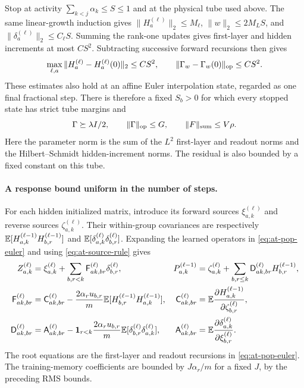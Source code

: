 Stop at activity $\sum_{k<j}\alpha_k\le S\le1$ and at the physical tube
used above.  The same linear-growth induction gives $\|H_a^{(\ell)}\|_2
\le M_\ell$, $\|w\|_2\le2M_LS$, and
$\|\delta_a^{(\ell)}\|_2\le C_\ell S$.
Summing the rank-one updates gives first-layer and hidden increments
at most $CS^2$.  Subtracting successive forward recursions then gives
\[
 \max_{\ell,a}\|H_a^{(\ell)}-H_a^{(\ell)}(0)\|_2\le CS^2,\qquad
 \|\Gamma_w-\Gamma_w(0)\|_{\rm op}\le CS^2.
\]
These estimates also hold at an affine Euler interpolation state, regarded
as one final fractional step.  There is therefore a fixed $S_b>0$ for
which every stopped state has strict tube margins and
\begin{equation}
 \Gamma\succeq\lambda I/2,\qquad \|\Gamma\|_{\rm op}\le G,\qquad
 \|F\|_{\rm sum}\le V\rho .
 \label{eq:at-pop-tube}
\end{equation}
Here the parameter norm is the sum of the $L^2$ first-layer and readout
norms and the Hilbert--Schmidt hidden-increment norms.  The residual is
also bounded by a fixed constant on this tube.

\paragraph{A response bound uniform in the number of steps.}
For each hidden initialized matrix, introduce its forward sources
$\xi_{a,k}^{(\ell)}$ and reverse sources $\zeta_{a,k}^{(\ell)}$.
Their within-group covariances are respectively
$\mathbb{E}[H_{a,k}^{(\ell-1)}H_{b,r}^{(\ell-1)}]$ and
$\mathbb{E}[\delta_{a,k}^{(\ell)}\delta_{b,r}^{(\ell)}]$.
Expanding the learned operators in \eqref{eq:at-pop-euler} and using
\eqref{eq:at-source-rule} gives
\begin{align}
 Z_{a,k}^{(\ell)}
 &=\xi_{a,k}^{(\ell)}
       +\sum_{b,r<k}\mathsf F_{ak,br}^{(\ell)}\delta_{b,r}^{(\ell)},
 &P_{a,k}^{(\ell-1)}
 &=\zeta_{a,k}^{(\ell)}
       +\sum_{b,r\le k}\mathsf D_{ak,br}^{(\ell)}H_{b,r}^{(\ell-1)},
 \label{eq:at-response-fields}\\
 \mathsf F_{ak,br}^{(\ell)}
 &=\mathsf C_{ak,br}^{(\ell)}
       -\frac{2\alpha_ru_{b,r}}m
          \mathbb{E}[H_{b,r}^{(\ell-1)}H_{a,k}^{(\ell-1)}],
 &\mathsf C_{ak,br}^{(\ell)}
 &=\mathbb{E}\frac{\partial H_{a,k}^{(\ell-1)}}{\partial\zeta_{b,r}^{(\ell)}},
 \nonumber\\
 \mathsf D_{ak,br}^{(\ell)}
 &=\mathsf A_{ak,br}^{(\ell)}
       -\mathbf1_{r<k}\frac{2\alpha_ru_{b,r}}m
          \mathbb{E}[\delta_{b,r}^{(\ell)}\delta_{a,k}^{(\ell)}],
 &\mathsf A_{ak,br}^{(\ell)}
 &=\mathbb{E}\frac{\partial\delta_{a,k}^{(\ell)}}{\partial\xi_{b,r}^{(\ell)}}.
 \nonumber
\end{align}
The root equations are the first-layer and readout recursions in
\eqref{eq:at-pop-euler}.  The training-memory coefficients are bounded
by $J\alpha_r/m$ for a fixed $J$, by the preceding RMS bounds.

